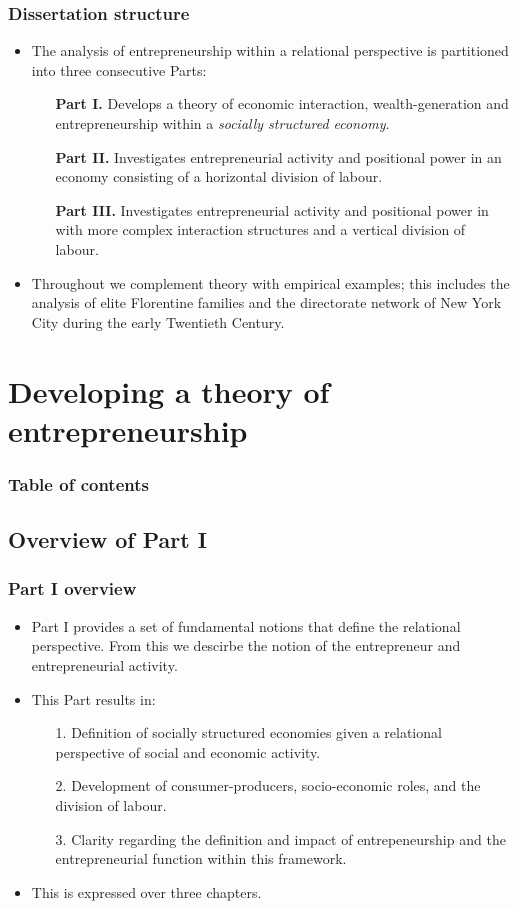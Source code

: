 \documentclass[10pt]{beamer}
\begin{document}
\begin{frame} \frametitle{Dissertation structure}
\begin{itemize}
\item The analysis of entrepreneurship within a relational perspective is partitioned into three consecutive Parts:
\begin{itemize}
\medskip
\item[\textbf{Part I.}] Develops a theory of economic interaction, wealth-generation and entrepreneurship within a \emph{socially structured economy}.
\medskip
\item[\textbf{Part II.}] Investigates entrepreneurial activity and positional power in an economy consisting of a horizontal division of labour.
\medskip
\item[\textbf{Part III.}] Investigates entrepreneurial activity and positional power in with more complex interaction structures and a vertical division of labour.
\end{itemize}
\medskip
\item Throughout we complement theory with empirical examples; this includes the analysis of elite Florentine families and the directorate network of New York City during the early Twentieth Century.
\end{itemize}
\end{frame}

\section{Developing a theory of entrepreneurship}

\begin{frame}
\frametitle{Table of contents}
\tableofcontents[currentsection]
\end{frame}

\subsection{Overview of Part I}

\begin{frame} \frametitle{Part I overview}
\begin{itemize}
\item Part I provides a set of fundamental notions that define the relational perspective. From this we descirbe the notion of the entrepreneur and entrepreneurial activity.
\medskip
\item This Part results in:
\begin{itemize}
\medskip
\item[1.] Definition of socially structured economies given a relational perspective of social and economic activity.
\medskip
\item[2.] Development of consumer-producers, socio-economic roles, and the division of labour.
\medskip
\item[3.] Clarity regarding the definition and impact of entrepeneurship and the entrepreneurial function within this framework.
\end{itemize}
\medskip
\item This is expressed over three chapters.
\end{itemize}
\end{frame}
\end{document}
